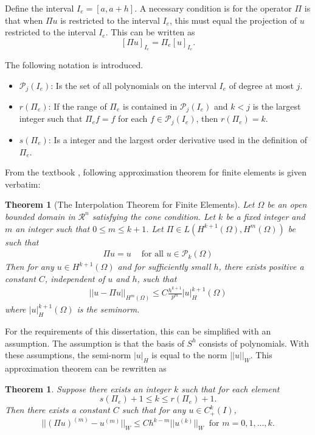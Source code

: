 \documentclass[../../main.tex]{subfiles}
\begin{document}
Define the interval $I_e = [a, a+h]$. A necessary condition is for the operator $\Pi$ is that when $\Pi u$ is restricted to the interval $I_e$, this must equal the projection of $u$ restricted to the interval $I_e$. This can be written as
\begin{equation*}
	\left[ \Pi u \right]_{I_{e}} = \Pi_e [u]_{I_{e}}.
\end{equation*}

The following notation is introduced.
\begin{itemize}
	\item[] $\mathcal{P}_j(I_e)$: Is the set of all polynomials on the interval $I_e$ of degree at most $j$. \label{sym:poly}
	\item[] $r(\Pi_e)$: If the range of $\Pi_e$ is contained in $\mathcal{P}_j(I_e)$ and $k<j$ is the largest integer such that $\Pi_e f = f$ for each $f \in \mathcal{P}_j(I_e)$, then $r(\Pi_e) = k$.
	\item[] $s(\Pi_e)$: Is a integer and the largest order derivative used in the definition of $\Pi_e$.
\end{itemize}

From the textbook \cite{OR76}, following approximation theorem for finite elements is given verbatim:
\newtheorem*{Interpolation}{Theorem}
\begin{Interpolation}[The Interpolation Theorem for Finite Elements] 
	Let $\Omega$ be an open bounded domain in $\mathcal{R}^n$ satisfying the cone condition. Let $k$ be a fixed integer and $m$ an integer such that $0\leq m \leq k+1$. Let $\Pi \in L(H^{k+1}(\Omega), H^{m}(\Omega))$ be such that
	\begin{eqnarray}
	    \Pi u = u \ \ \ \ \textrm{ for all } u \in \mathcal{P}_k(\Omega)
	\end{eqnarray}
	Then for any $u \in H^{k+1}(\Omega)$ and for sufficiently small $h$, there exists positive a constant $C$, independent of $u$ and $h$, such that
	\begin{eqnarray}
	    ||u - \Pi u||_{H^m(\Omega)} \leq C \frac{h^{k+1}}{p^m} |u|_H^{k+1}(\Omega)
	\end{eqnarray}
	where $|u|_H^{k+1}(\Omega)$ is the seminorm.
\end{Interpolation}

For the requirements of this dissertation, this can be simplified with an assumption. The assumption is that the basis of $S^h$ consists of polynomials. With these assumptions, the semi-norm $|u|_H$ is equal to the norm $||u||_{W}$. This approximation theorem can be rewritten as
\newtheorem{Interpolation_2}{Theorem}
\begin{Interpolation_2}
	Suppose there exists an integer $k$ such that for each element
	\begin{equation*}
		s(\Pi_e) + 1 \leq k \leq r(\Pi_e) +1.
	\end{equation*}
	Then there exists a constant $C$ such that for any $u \in C^k_+(I)$,
	\begin{equation*}
		||(\Pi u)^{(m)} - u^{(m)}||_{W} \leq C h^{k-m} || u^{(k)}||_{W} \ \text{ for } m = 0,1,...,k.
	\end{equation*}
\end{Interpolation_2}
\end{document}
